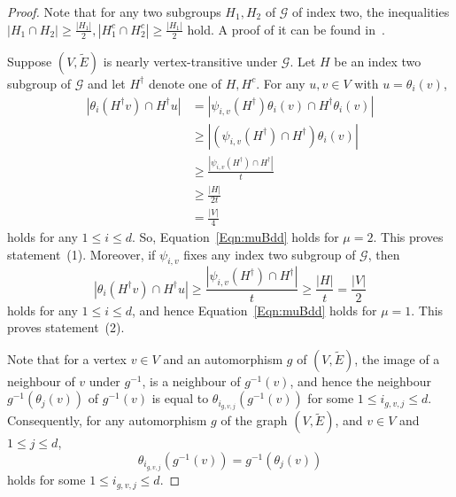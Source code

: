 \documentclass[10pt]{article}
\theoremstyle{definition}
\newcommand{\mo}{{-1}}
\newcommand{\calG}{\ensuremath{\mathcal{G}}}
\begin{document}
\begin{proof}
Note that for any two subgroups $H_1, H_2$ of $\calG$ of index two, the inequalities 
$|H_1\cap H_2| \geq \frac{|H_1|}{2}, |H_1^c\cap H_2^c| \geq \frac{|H_1|}{2}$
hold. A proof of it can be found in~\cite{CheegerTwisted}.

Suppose $(V, \widetilde E)$ is nearly vertex-transitive under $\calG$. Let $H$ be an index two subgroup of $\calG$ and let $H^\dag$ denote one of $H, H^c$. For any $u,v\in V$ with $u = \theta_i(v)$, 
\begin{align*}
|\theta_i(H^\dag v) \cap H^\dag u|
& = |\psi_{i,v} (H^\dag) \theta_i(v) \cap H^\dag \theta_i(v)|\\
& \geq |(\psi_{i,v} (H^\dag) \cap H^\dag) \theta_i(v)| \\
& \geq \frac{|\psi_{i,v} (H^\dag) \cap H^\dag|}{t} \\
& \geq \frac{|H|}{2t} \\
&= \frac{|V|}{4}
\end{align*}
holds for any $1\leq i \leq d$. So, Equation~\eqref{Eqn:muBdd} holds for $\mu = 2$. This proves statement~(1). Moreover, if $\psi_{i, v}$ fixes any index two subgroup of $\calG$, then 
$$
|\theta_i(H^\dag v) \cap H^\dag u|
\geq
\frac{|\psi_{i,v} (H^\dag) \cap H^\dag|}{t} 
 \geq \frac{|H|}{t}
 = \frac{|V|}{2}
$$
holds for any $1\leq i \leq d$, and hence Equation~\eqref{Eqn:muBdd} holds for $\mu = 1$. This proves statement~(2). 

Note that for a vertex $v \in V$ and an automorphism $g$ of $(V, \widetilde E)$, the image of a neighbour of $v$ under $g^\mo$, is a neighbour of $g^\mo (v)$, and hence the neighbour $g^\mo (\theta_j(v))$ of $g^\mo(v)$ is equal to $\theta_{i_{g, v, j}} (g^\mo(v))$ for some $1\leq i_{g, v, j} \leq d$. Consequently, for any automorphism $g$ of the graph $(V, \widetilde E)$, and $v\in V$ and $1\leq j \leq d$, 
\[\theta_{i_{g, v, j}} (g^\mo (v)) = g^\mo (\theta_j(v))\]
holds for some $1\leq i_{g, v, j} \leq d$.


\end{proof}
\end{document}
